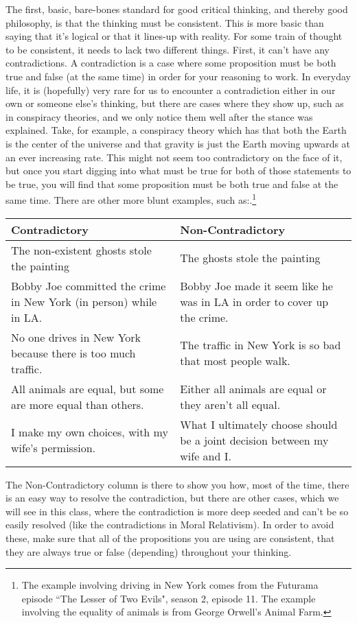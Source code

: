 The first, basic, bare-bones standard for good critical thinking, and thereby good philosophy, is that the thinking must be consistent. This is more basic than saying that it's logical or that it lines-up with reality. For some train of thought to be consistent, it needs to lack two different things. First, it can't have any contradictions. A contradiction is a case where some proposition must be both true and false (at the same time) in order for your reasoning to work. In everyday life, it is (hopefully) very rare for us to encounter a contradiction either in our own or someone else's thinking, but there are cases where they show up, such as in conspiracy theories, and we only notice them well after the stance was explained. Take, for example, a conspiracy theory which has that both the Earth is the center of the universe and that gravity is just the Earth moving upwards at an ever increasing rate. This might not seem too contradictory on the face of it, but once you start digging into what must be true for both of those statements to be true, you will find that some proposition must be both true and false at the same time. There are other more blunt examples, such as:.\footnote{The example involving driving in New York comes from the Futurama episode ``The Lesser of Two Evils", season 2, episode 11. The example involving the equality of animals is from George Orwell's Animal Farm.} 

\begin{tabular}{p{2.5in}|p{2.5in}}
Contradictory &Non-Contradictory\\\hline
The non-existent ghosts stole the painting &The ghosts stole the painting\\\hline
Bobby Joe committed the crime in New York (in person) while in LA. &Bobby Joe made it seem like he was in LA in order to cover up the crime.\\\hline
No one drives in New York because there is too much traffic.&The traffic in New York is so bad that most people walk.\\\hline
All animals are equal, but some are more equal than others. &Either all animals are equal or they aren't all equal.\\\hline
I make my own choices, with my wife's permission. &What I ultimately choose should be a joint decision between my wife and I.\\\hline
\end{tabular}

The Non-Contradictory column is there to show you how, most of the time, there is an easy way to resolve the contradiction, but there are other cases, which we will see in this class, where the contradiction is more deep seeded and can't be so easily resolved (like the contradictions in Moral Relativism). In order to avoid these, make sure that all of the propositions you are using are consistent, that they are always true or false (depending) throughout your thinking.

